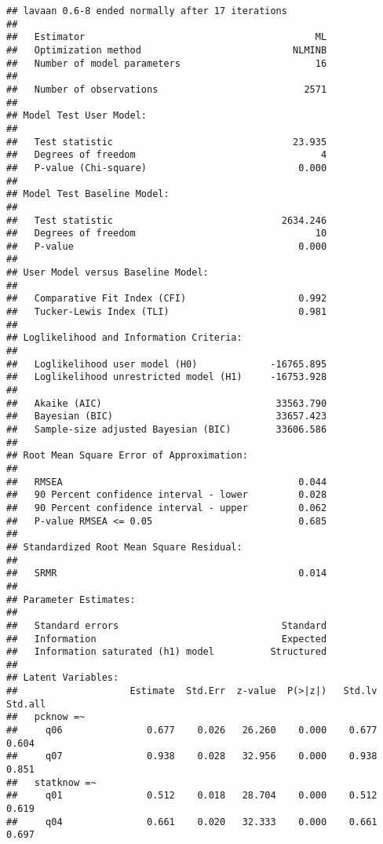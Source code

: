\documentclass[
]{article}
\begin{document}
\begin{verbatim}
## lavaan 0.6-8 ended normally after 17 iterations
## 
##   Estimator                                         ML
##   Optimization method                           NLMINB
##   Number of model parameters                        16
##                                                       
##   Number of observations                          2571
##                                                       
## Model Test User Model:
##                                                       
##   Test statistic                                23.935
##   Degrees of freedom                                 4
##   P-value (Chi-square)                           0.000
## 
## Model Test Baseline Model:
## 
##   Test statistic                              2634.246
##   Degrees of freedom                                10
##   P-value                                        0.000
## 
## User Model versus Baseline Model:
## 
##   Comparative Fit Index (CFI)                    0.992
##   Tucker-Lewis Index (TLI)                       0.981
## 
## Loglikelihood and Information Criteria:
## 
##   Loglikelihood user model (H0)             -16765.895
##   Loglikelihood unrestricted model (H1)     -16753.928
##                                                       
##   Akaike (AIC)                               33563.790
##   Bayesian (BIC)                             33657.423
##   Sample-size adjusted Bayesian (BIC)        33606.586
## 
## Root Mean Square Error of Approximation:
## 
##   RMSEA                                          0.044
##   90 Percent confidence interval - lower         0.028
##   90 Percent confidence interval - upper         0.062
##   P-value RMSEA <= 0.05                          0.685
## 
## Standardized Root Mean Square Residual:
## 
##   SRMR                                           0.014
## 
## Parameter Estimates:
## 
##   Standard errors                             Standard
##   Information                                 Expected
##   Information saturated (h1) model          Structured
## 
## Latent Variables:
##                    Estimate  Std.Err  z-value  P(>|z|)   Std.lv  Std.all
##   pcknow =~                                                             
##     q06               0.677    0.026   26.260    0.000    0.677    0.604
##     q07               0.938    0.028   32.956    0.000    0.938    0.851
##   statknow =~                                                           
##     q01               0.512    0.018   28.704    0.000    0.512    0.619
##     q04               0.661    0.020   32.333    0.000    0.661    0.697

\end{verbatim}
\end{document}
